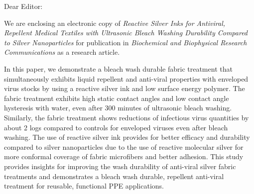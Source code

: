 \documentclass[11pt]{letter}
\date{\today}
\begin{document}
\begin{letter}{}


\opening{Dear Editor:}
 We are enclosing an electronic copy of \textit{Reactive Silver Inks for Antiviral, Repellent Medical Textiles with Ultrasonic Bleach Washing Durability Compared to Silver Nanoparticles}
for publication in %
\textit{Biochemical and Biophysical Research Communications} as a research article.


In this paper, we demonstrate a bleach wash durable 
fabric treatment that simultaneously exhibits liquid repellent and anti-viral properties with enveloped virus stocks by using a reactive silver ink and low surface energy polymer. %
The fabric treatment 
exhibits high static contact angles and low contact angle hysteresis with water, even after 300 minutes of ultrasonic bleach washing. Similarly, the fabric treatment shows reductions of infectious virus quantities by about 2 logs compared to controls for enveloped viruses even after bleach washing. The use of reactive silver ink provides for 
better efficacy and durability compared to silver nanoparticles due to the use of reactive molecular silver for more conformal coverage of fabric microfibers and better adhesion.  This study provides insights for improving the wash durability of anti-viral silver fabric treatments and demonstrates a bleach wash durable, repellent anti-viral treatment for reusable, functional PPE applications. 


\end{letter}
\end{document}
